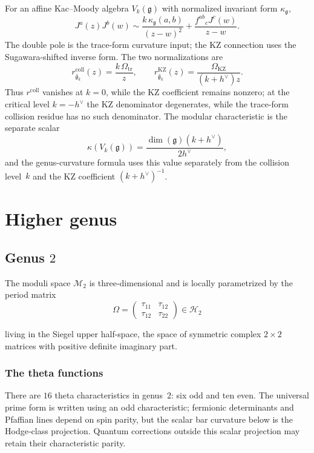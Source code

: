 For an affine Kac--Moody algebra $V_k(\mathfrak g)$ with normalized
invariant form $\kappa_{\mathfrak g}$,
\[
J^a(z)J^b(w)
\sim
\frac{k\,\kappa_{\mathfrak g}(a,b)}{(z-w)^2}
+\frac{f^{ab}{}_cJ^c(w)}{z-w}.
\]
The double pole is the trace-form curvature input; the KZ connection
uses the Sugawara-shifted inverse form.  The two normalizations are
\begin{equation}\label{eq:qc-trace-kz-normalizations}
r^{\mathrm{coll}}_{\widehat{\mathfrak g}_k}(z)
 = \frac{k\,\Omega_{\mathrm{tr}}}{z},
\qquad
r^{\mathrm{KZ}}_{\widehat{\mathfrak g}_k}(z)
 = \frac{\Omega_{\mathrm{KZ}}}{(k+h^\vee)z}.
\end{equation}
Thus $r^{\mathrm{coll}}$ vanishes at $k=0$, while the KZ coefficient
remains nonzero; at the critical level $k=-h^\vee$ the KZ denominator
degenerates, while the trace-form collision residue has no such
denominator.  The modular characteristic is the separate scalar
\[
\kappa(V_k(\mathfrak g))
 = \frac{\dim(\mathfrak g)(k+h^\vee)}{2h^\vee},
\]
and the genus-curvature formula uses this value separately from the
collision level~$k$ and the KZ coefficient $(k+h^\vee)^{-1}$.

\section{Higher genus}

\subsection{\texorpdfstring{Genus $2$}{Genus 2}}

The moduli space $\mathcal{M}_2$ is three-dimensional and is locally
parametrized by the period matrix
\[\Omega = \begin{pmatrix} \tau_{11} & \tau_{12} \\ \tau_{12} & \tau_{22} \end{pmatrix} \in \mathcal{H}_2\]

living in the Siegel upper half-space, the space of symmetric complex $2 \times 2$ matrices with positive definite imaginary part.

\subsubsection{The theta functions}

There are $16$ theta characteristics in genus~$2$: six odd and ten
even.  The universal prime form is written using an odd
characteristic; fermionic determinants and Pfaffian lines depend on
spin parity, but the scalar bar curvature below is the Hodge-class
projection.  Quantum corrections outside this scalar projection may
retain their characteristic parity.

